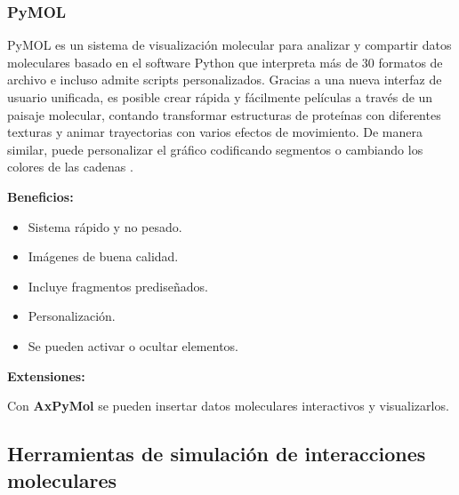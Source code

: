 \documentclass[11pt, letterpaper, spanish]{article}
\begin{document}
{{        \subsubsection{PyMOL}
        \par{PyMOL es un sistema de visualización molecular para analizar y compartir datos moleculares basado en el software Python que interpreta más de 30 formatos de archivo e incluso admite scripts personalizados. Gracias a una nueva interfaz de usuario unificada, es posible crear rápida y fácilmente películas a través de un paisaje molecular, contando transformar estructuras de proteínas con diferentes texturas y animar trayectorias con varios efectos de movimiento. De manera similar, puede personalizar el gráfico codificando segmentos o cambiando los colores de las cadenas \cite{Yuan_2017}.}
        \par{\textbf{Beneficios:}}
            \begin{itemize}
                \item Sistema rápido y no pesado.
                \item Imágenes de buena calidad.
                \item Incluye fragmentos prediseñados.
                \item Personalización.
                \item Se pueden activar o ocultar elementos.
            \end{itemize}
            \par{\textbf{Extensiones:}}
            \par{Con \textbf{AxPyMol} se pueden insertar datos moleculares interactivos y visualizarlos.}
       
    \subsection{Herramientas de simulación de interacciones moleculares}
}}
\end{document}
